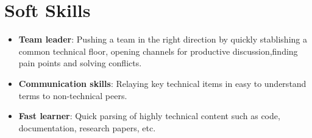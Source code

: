 \documentclass[letterpaper,11pt]{article}
\newcommand{\resumeItem}[2]{
  \item\small{
    \textbf{#1}{: #2 \vspace{-2pt}}
  }
}
\newcommand{\resumeSubItem}[2]{\resumeItem{#1}{#2}\vspace{-4pt}}
\newcommand{\resumeSubHeadingListStart}{\begin{itemize}[leftmargin=*]}
\newcommand{\resumeSubHeadingListEnd}{\end{itemize}}
\begin{document}
\section{Soft Skills}
 \resumeSubHeadingListStart
  \resumeSubItem{Team leader}{Pushing a team in the right direction by
  quickly stablishing a common technical floor, opening channels for productive discussion,finding pain points and
  solving conflicts.}
  \resumeSubItem{Communication skills}{Relaying key technical items in easy to understand terms to non-technical peers.}
  \resumeSubItem{Fast learner}{Quick parsing of highly technical content such as code, documentation, research papers, etc.}
 \resumeSubHeadingListEnd


\end{document}
